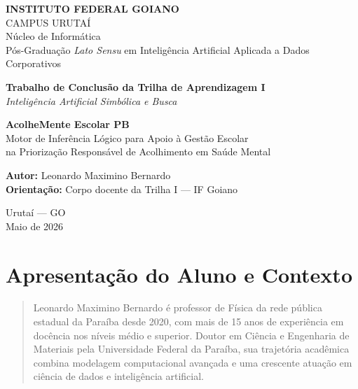 \documentclass[11pt]{article}
\begin{document}
    \begin{titlepage}
    \centering

    {\small \textbf{INSTITUTO FEDERAL GOIANO} \\}
    {\small CAMPUS URUTAÍ \\}
    {\footnotesize Núcleo de Informática \\}
    {\footnotesize Pós-Graduação \textit{Lato Sensu} em Inteligência Artificial Aplicada a Dados Corporativos \\}

    \vspace{1.2cm}

    {\Large \textbf{Trabalho de Conclusão da Trilha de Aprendizagem I} \\}
    {\large \textit{Inteligência Artificial Simbólica e Busca} \\}

    \vspace{1.5cm}

    {\Large \textbf{AcolheMente Escolar PB} \\}
    \vspace{0.3cm}
    {\large Motor de Inferência Lógico para Apoio à Gestão Escolar \\
    na Priorização Responsável de Acolhimento em Saúde Mental}

    \vspace{1.5cm}

    {\large \textbf{Autor:} Leonardo Maximino Bernardo \\}
    {\normalsize \textbf{Orientação:} Corpo docente da Trilha I --- IF Goiano}

    \vfill

    {\large Urutaí --- GO \\}
    {\large Maio de 2026}
\end{titlepage}
\tableofcontents
\newpage


    \section{Apresentação do Aluno e
Contexto}\label{apresentauxe7uxe3o-do-aluno-e-contexto}

\begin{quote}
Leonardo Maximino Bernardo é professor de Física da rede pública
estadual da Paraíba desde 2020, com mais de 15 anos de experiência em
docência nos níveis médio e superior. Doutor em Ciência e Engenharia de
Materiais pela Universidade Federal da Paraíba, sua trajetória acadêmica
combina modelagem computacional avançada e uma crescente atuação em
ciência de dados e inteligência artificial.
\end{quote}
\end{document}

